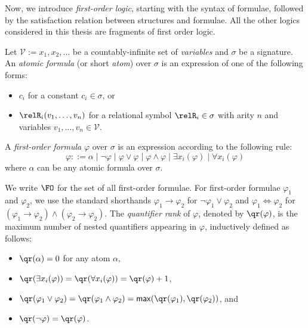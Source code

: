 Now, we introduce \emph{first-order logic}, starting with the syntax of formulae, followed by the satisfaction relation between structures and formulae.
All the other logics considered in this thesis are fragments of first order logic.
\begin{definition}
  Let $\mathcal{V} := {x_{1}, x_{2}, \ldots}$ be a countably-infinite set of \emph{variables} and $\sigma$ be a signature.
  An \emph{atomic formula} (or short \emph{atom}) over $\sigma$ is an expression of one of the following forms:
  \begin{itemize}
    \item $c_{i}$ for a constant $c_{i} \in \sigma$, or
    \item $\relR_{i}(v_{1}, \ldots, v_{n})$ for a relational symbol $\relR_{i} \in \sigma$ with arity $n$ and variables $v_{1}, \ldots, v_{n} \in \mathcal{V}$.
  \end{itemize}
  A \emph{first-order formula} $\varphi$ over $\sigma$ is an expression according to the following rule:
  \begin{equation*}
    \varphi ::= \alpha
      \mid \neg \varphi
      \mid \varphi \lor \varphi
      \mid \varphi \land \varphi
      \mid \exists{x_{i}}(\varphi)
      \mid \forall{x_{i}}(\varphi)
  \end{equation*}
  where $\alpha$ can be any atomic formula over $\sigma$.
\end{definition}
We write $\FO$ for the set of all first-order formulae.
For first-order formulae $\varphi_{1}$ and $\varphi_{2}$, we use the standard shorthands $\varphi_{1} \to \varphi_{2}$ for $\neg \varphi_{1} \lor \varphi_{2}$ and $\varphi_{1} \iff \varphi_{2}$ for $(\varphi_{1} \to \varphi_{2}) \land (\varphi_{2} \to \varphi_{2})$.
The \emph{quantifier rank} of $\varphi$, denoted by $\qr(\varphi)$, is the maximum number of nested quantifiers appearing in $\varphi$, inductively defined as follows:
\begin{itemize}
  \item $\qr(\alpha) = 0$ for any atom $\alpha$,
  \item $\qr(\exists{x_{i}}(\varphi)) = \qr(\forall{x_{i}}(\varphi)) = \qr(\varphi) + 1$,
  \item $\qr(\varphi_{1} \lor \varphi_{2}) = \qr(\varphi_{1} \land \varphi_{2})  = \mathsf{max}(\qr(\varphi_{1}), \qr(\varphi_{2}))$, and
  \item $\qr(\neg \varphi)  = \qr(\varphi)$.
\end{itemize}


